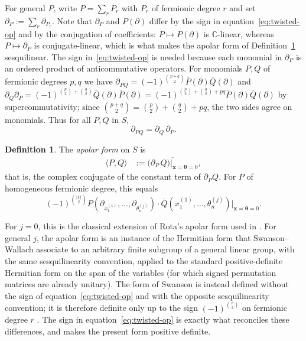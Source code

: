 \documentclass[12pt]{amsart}
\theoremstyle{plain}
\theoremstyle{definition}
\newtheorem{definition}[theorem]{Definition}
\newcommand{\C}{\mathbb{C}}
\begin{document}
For general $P$, write $P = \sum_r P_r$ with $P_r$ of fermionic degree $r$ and set $\partial_P := \sum_r \partial_{P_r}$.
Note that $\partial_P$ and $P(\partial)$ differ by the sign in equation~\eqref{eq:twisted-op} and by the conjugation of coefficients: $P \mapsto P(\partial)$ is $\C$-linear, whereas $P \mapsto \partial_P$ is conjugate-linear, which is what makes the apolar form of Definition~\ref{def:apolar} sesquilinear.
The sign in~\eqref{eq:twisted-op} is needed because each monomial in $\partial_P$ is an ordered product of anticommutative operators.
For monomials $P,Q$ of fermionic degrees $p,q$ we have $\partial_{PQ} = (-1)^{\binom{p+q}{2}}\overline{P}(\partial)\overline{Q}(\partial)$ and $\partial_Q \partial_P = (-1)^{\binom{p}{2}+\binom{q}{2}}\overline{Q}(\partial)\overline{P}(\partial) = (-1)^{\binom{p}{2}+\binom{q}{2}+pq}\overline{P}(\partial)\overline{Q}(\partial)$ by supercommutativity; since $\binom{p+q}{2} = \binom{p}{2}+\binom{q}{2}+pq$, the two sides agree on monomials.
Thus for all $P,Q$ in $S$,
\begin{equation}\label{eq:antihom}
    \partial_{PQ} = \partial_Q\, \partial_P.
\end{equation}
\begin{definition}\label{def:apolar}
The \emph{apolar form} on $S$ is
\begin{equation}\label{eq:inner-product}
    \begin{aligned}
    \langle P, Q \rangle &:= \overline{\big(\partial_P\, Q\big)\big|_{\bm{x} = \bm{\theta} = 0}},
\end{aligned}
\end{equation}
that is, the complex conjugate of the constant term of $\partial_P Q$.
For $P$ of homogeneous fermionic degree, this equals
\begin{equation}
    (-1)^{\binom{|P|}{2}} P(\partial_{x_1^{(1)}},\ldots,
        \partial_{\theta_n^{(j)}}) \cdot \overline{Q}(x_1^{(1)}, \ldots,
        \theta_n^{(j)}) \big|_{\bm{x} = \bm{\theta} = 0}.
\end{equation}
\end{definition}
For $j = 0$, this is the classical extension of Rota's apolar form used in \cite[Section 1.3]{Haiman1994}.
For general $j$, the apolar form is an instance of the Hermitian form that Swanson--Wallach \cite[Section 2.4]{SwansonWallach1} associate to an arbitrary finite subgroup of a general linear group, with the same sesquilinearity convention, applied to the standard positive-definite Hermitian form on the span of the variables (for which signed permutation matrices are already unitary).
The form of Swanson \cite[Definitions 4.3 and 5.1]{SwansonPreprint} is instead defined without the sign of equation~\eqref{eq:twisted-op} and with the opposite sesquilinearity convention; it is therefore definite only up to the sign $(-1)^{\binom{r}{2}}$ on fermionic degree $r$ \cite[Lemma 5.2]{SwansonPreprint}.
The sign in equation~\eqref{eq:twisted-op} is exactly what reconciles these differences, and makes the present form positive definite.
\end{document}
